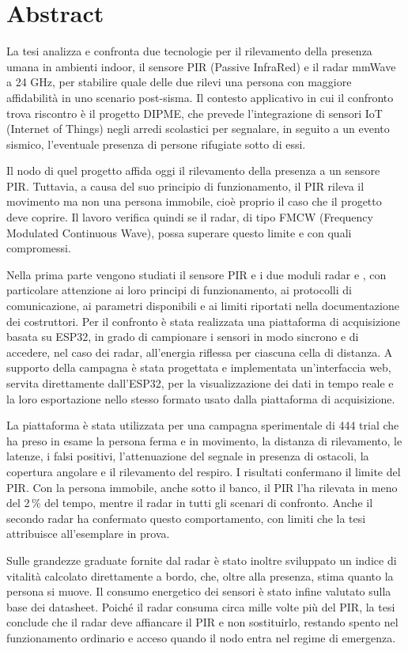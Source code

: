 \chapter*{Abstract}
\label{chap:Abstract}

La tesi analizza e confronta due tecnologie per il rilevamento della presenza umana in ambienti indoor, il sensore PIR (Passive InfraRed) e il radar mmWave a 24 GHz, per stabilire quale delle due rilevi una persona con maggiore affidabilità in uno scenario post-sisma. Il contesto applicativo in cui il confronto trova riscontro è il progetto DIPME, che prevede l’integrazione di sensori IoT (Internet of Things) negli arredi scolastici per segnalare, in seguito a un evento sismico, l’eventuale presenza di persone rifugiate sotto di essi.

Il nodo di quel progetto affida oggi il rilevamento della presenza a un sensore PIR. Tuttavia, a causa del suo principio di funzionamento, il PIR rileva il movimento ma non una persona immobile, cioè proprio il caso che il progetto deve coprire. Il lavoro verifica quindi se il radar, di tipo FMCW (Frequency Modulated Continuous Wave), possa superare questo limite e con quali compromessi.

Nella prima parte vengono studiati il sensore PIR \pir{} e i due moduli radar \ldb{} e \ldc{}, con particolare attenzione ai loro principi di funzionamento, ai protocolli di comunicazione, ai parametri disponibili e ai limiti riportati nella documentazione dei costruttori. Per il confronto è stata realizzata una piattaforma di acquisizione basata su ESP32, in grado di campionare i sensori in modo sincrono e di accedere, nel caso dei radar, all’energia riflessa per ciascuna cella di distanza. A supporto della campagna è stata progettata e implementata un’interfaccia web, servita direttamente dall’ESP32, per la visualizzazione dei dati in tempo reale e la loro esportazione nello stesso formato usato dalla piattaforma di acquisizione.

La piattaforma è stata utilizzata per una campagna sperimentale di 444 trial che ha preso in esame la persona ferma e in movimento, la distanza di rilevamento, le latenze, i falsi positivi, l’attenuazione del segnale in presenza di ostacoli, la copertura angolare e il rilevamento del respiro. I risultati confermano il limite del PIR. Con la persona immobile, anche sotto il banco, il PIR l’ha rilevata in meno del 2\,\% del tempo, mentre il radar in tutti gli scenari di confronto. Anche il secondo radar ha confermato questo comportamento, con limiti che la tesi attribuisce all’esemplare in prova.

Sulle grandezze graduate fornite dal radar è stato inoltre sviluppato un indice di vitalità calcolato direttamente a bordo, che, oltre alla presenza, stima quanto la persona si muove. Il consumo energetico dei sensori è stato infine valutato sulla base dei datasheet. Poiché il radar consuma circa mille volte più del PIR, la tesi conclude che il radar deve affiancare il PIR e non sostituirlo, restando spento nel funzionamento ordinario e acceso quando il nodo entra nel regime di emergenza.
